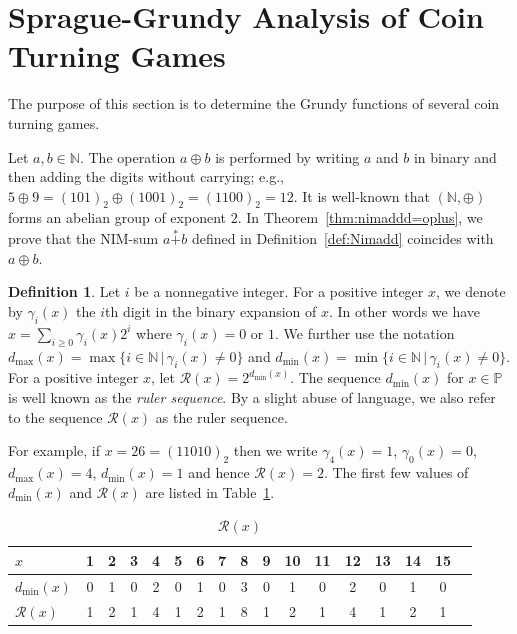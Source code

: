 \documentclass[a4paper,11pt]{amsart}
\theoremstyle{definition}
\newtheorem{dfn}{Definition}[section]
\newcommand{\nimadd}{\overset{*}{+}}
\numberwithin{equation}{section}
\def\Non{\mathbb{N}}
\def\Pos{\mathbb{P}}
\def\fnh#1{\mathscr{R}\left({#1}\right)}
\def\digit#1#2{\gamma_{#1}\left({#2}\right)}
\def\placemax#1{d_{\max}\left({#1}\right)}
\def\placemin#1{d_{\min}\left({#1}\right)}
\begin{document}
\section{Sprague-Grundy Analysis of Coin Turning Games}\label{sc:SG-Analysis}
%
The purpose of this section is to determine the Grundy functions of several coin turning games.
%
\par
%
Let $a, b\in\Non$.
%
The operation $a\oplus b$ is performed by writing \(a\) and \(b\) in binary and then adding the digits without carrying; e.g., 
$5\oplus9=(101)_{2}\oplus (1001)_{2}=(1100)_{2}=12$.
%
It is well-known that $(\Non,\oplus)$ forms an abelian group of exponent $2$.
%
In Theorem~\ref{thm:nimaddd=oplus}, we prove that the NIM-sum \(a\nimadd b\) defined in Definition~\ref{def:Nimadd} coincides with \(a\oplus b\).
%
\begin{dfn}\label{def:binary}
%
Let $i$ be a nonnegative integer.
For a positive integer $x$,
we denote by $\digit{i}{x}$ the $i$th digit in the binary expansion of $x$.
In other words we have $x=\sum_{i\geq0}\digit{i}{x}2^{i}$ where $\digit{i}{x}=0\text{ or }1$.
We further use the notation
$\placemax{x}=\max\{i\in\Non \,|\, \digit{i}{x}\neq 0\}$ and 
$\placemin{x}=\min\{i\in\Non \,|\, \digit{i}{x}\neq 0\}$.
For a positive integer \(x\), let $\fnh{x}=2^{\placemin{x}}$.
The sequence $\placemin{x}$ for $x\in\Pos$ is well known as the \textsl{ruler sequence}.
By a slight abuse of language, we also refer to the sequence $\fnh{x}$ as the ruler sequence.
%
\end{dfn}
%
For example,
if $x=26=(11010)_{2}$ then we write $\digit{4}{x}=1$, $\digit{0}{x}=0$, $\placemax{x}=4$,
 $\placemin{x}=1$ and hence $\fnh{x}=2$.
%
The first few values of $\placemin{x}$ and $\fnh{x}$ are listed in Table~\ref{tbl:phi}.
%
\begin{table}[h]
 \begin{center}
	\begin{tabular}{|l||c|c|c|c|c|c|c|c|c|c|c|c|c|c|c|c|} \hline
$x$            &   1 &  2 &  3 &  4 &  5 &  6 &  7 &  8 &  9 & 10 & 11 & 12 & 13 & 14 & 15 \\\hline%
$\placemin{x}$ &   0 &  1 &  0 &  2 &  0 &  1 &  0 &  3 &  0 &  1 &  0 &  2 &  0 &  1 &  0 \\\hline
$\fnh{x}$      &   1 &  2 &  1 &  4 &  1 &  2 &  1 &  8 &  1 &  2 &  1 &  4 &  1 &  2 &  1 \\\hline
	\end{tabular}
   \caption{$\fnh{x}$\label{tbl:phi}}
 \end{center}
\end{table}
%
%
\end{document}
